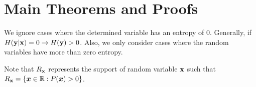 \documentclass{article} %
\theoremstyle{plain}
\newtheorem{lemma}[theorem]{Lemma}
\theoremstyle{definition}
\theoremstyle{remark}
\begin{document}


    


\section{Main Theorems and Proofs}

\label{mainproofs}

We ignore cases where the determined variable has an entropy of 0. Generally, if $H({\mathbf{y}}| {\mathbf{x}}) = 0 \rightarrow H({\mathbf{y}}) > 0$. Also, we only consider cases where the random variables have more than zero entropy.

Note that $R_{{\mathbf{x}}}$ represents the support of random variable ${\mathbf{x}}$ such that $R_{{\mathbf{x}}} = \{{\bm{x}} \in \mathbb{R} : P({\bm{x}}) > 0\}$.










    
\end{document}
